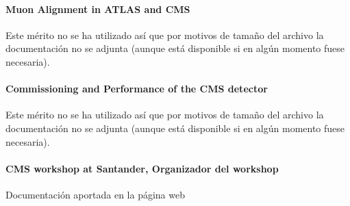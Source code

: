 \documentclass[a4paper, 11pt, twoside, openright]{report}
\begin{document}
\paragraph{Muon Alignment in ATLAS and CMS}
%
Este mérito no se ha utilizado así que por motivos de tamaño del archivo la documentación no se adjunta (aunque está disponible si en algún momento fuese necesaria).

\paragraph{Commissioning and Performance of the CMS detector}
%
Este mérito no se ha utilizado así que por motivos de tamaño del archivo la documentación no se adjunta (aunque está disponible si en algún momento fuese necesaria).

%

%

%

\paragraph{CMS workshop at Santander, Organizador del workshop}
%
Documentación aportada en la página web
\end{document}
